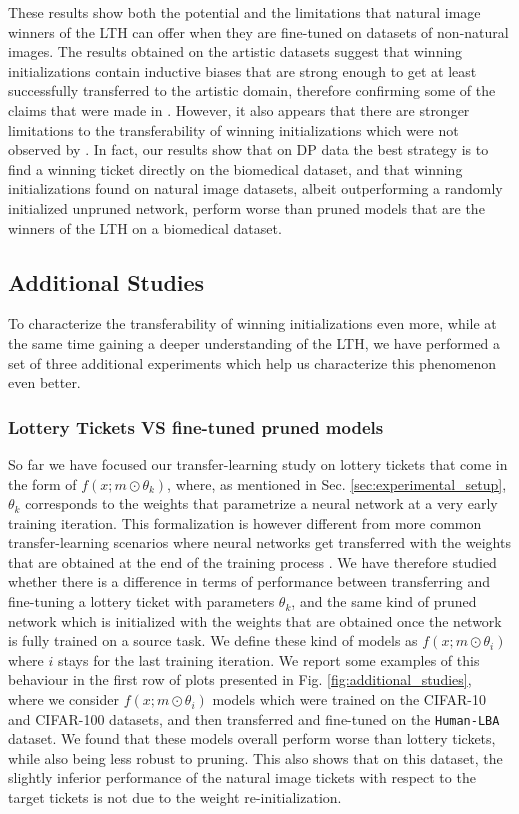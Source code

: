 These results show both the potential and the limitations that natural image winners of the LTH can offer when they are fine-tuned on datasets of non-natural images. The results obtained on the artistic datasets suggest that winning initializations contain inductive biases that are strong enough to get at least successfully transferred to the artistic domain, therefore confirming some of the claims that were made in \cite{morcos2019one}. However, it also appears that there are stronger limitations to the transferability of winning initializations which were not observed by \cite{morcos2019one}. In fact, our results show that on DP data the best strategy is to find a winning ticket directly on the biomedical dataset, and that winning initializations found on natural image datasets, albeit outperforming a randomly initialized unpruned network, perform worse than pruned models that are the winners of the LTH on a biomedical dataset.

\subsection{Additional Studies}
\label{sec:additional_studies}
To characterize the transferability of winning initializations even more, while at the same time gaining a deeper understanding of the LTH, we have performed a set of three additional experiments which help us characterize this phenomenon even better. 

\subsubsection{Lottery Tickets VS fine-tuned pruned models}
So far we have focused our transfer-learning study on lottery tickets that come in the form of $f(x;m\odot\theta_k)$, where, as mentioned in Sec. \ref{sec:experimental_setup}, $\theta_k$ corresponds to the weights that parametrize a neural network at a very early training iteration. This formalization is however different from more common transfer-learning scenarios where neural networks get transferred with the weights that are obtained at the end of the training process \cite{mormont2018comparison,sabatelli2018deep}. We have therefore studied whether there is a difference in terms of performance between transferring and fine-tuning a lottery ticket with parameters $\theta_k$, and the same kind of pruned network which is initialized with the weights that are obtained once the network is fully trained on a source task. We define these kind of models as $f(x;m\odot\theta_i)$ where $i$ stays for the last training iteration.  We report some examples of this behaviour in the first row of plots presented in Fig. \ref{fig:additional_studies}, where we consider $f(x;m\odot\theta_i)$ models which were trained on the CIFAR-10 and CIFAR-100 datasets, and then transferred and fine-tuned on the \texttt{Human-LBA} dataset. We found that these models overall perform worse than lottery tickets, while also being less robust to pruning. This also shows that on this dataset, the slightly inferior performance of the natural image tickets with respect to the target tickets is not due to the weight re-initialization.

